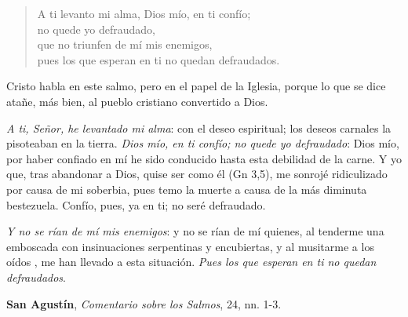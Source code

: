 \begin{liturgiabox}{ }
	
	\begin{quote}
		A ti levanto mi alma, Dios mío, en ti confío; \\no quede yo defraudado, \\que no triunfen de mí mis enemigos, \\pues los que esperan en ti no quedan defraudados.
	\end{quote}
	
	\begin{liturgiatext}
		
		Cristo habla en este salmo, pero en el papel de la Iglesia, porque lo que se dice atañe, más bien, al pueblo cristiano convertido a Dios.
		
		\emph{A ti, Señor, he levantado mi alma}: con el deseo espiritual; los deseos carnales la pisoteaban en la tierra. \emph{Dios mío, en ti confío; no quede yo defraudado}: Dios mío, por haber confiado en mí he sido conducido hasta esta debilidad de la carne. Y yo que, tras abandonar a Dios, quise ser como él (Gn 3,5), me sonrojé ridiculizado por causa de mi soberbia, pues temo la muerte a causa de la más diminuta bestezuela. Confío, pues, ya en ti; no seré defraudado.
		
		\emph{Y no se rían de mí mis enemigos}: y no se rían de mí quienes, al tenderme una emboscada con insinuaciones serpentinas y encubiertas, y al musitarme a los oídos , me han llevado a esta situación. \emph{Pues los que esperan en ti no quedan defraudados}.
		
		\textbf{San Agustín}, \emph{Comentario sobre los Salmos}, 24, nn. 1-3.
	\end{liturgiatext}
\end{liturgiabox}


\newpage

